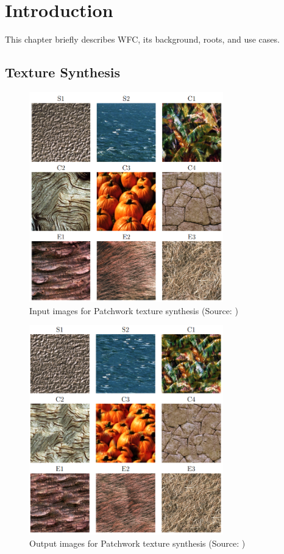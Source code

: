 \documentclass[shortabstract, english, inz]{iithesis}
\author         {Krzysztof Sławik}
\date          {03.02.2023}                     %
\begin{document}

\chapter{Introduction}
This chapter briefly describes WFC, its background, roots, and use cases.
\section{Texture Synthesis}
\begin{figure}[H]
\centering
\includegraphics[width=0.75\textwidth, angle=0]{images/texsynth_input.png}
\caption{Input images for Patchwork texture synthesis (Source: \cite{harrison2002patchwork})}
\label{fig:texSynthIn}
\end{figure}
\begin{figure}[H]
\centering
\includegraphics[width=0.75\textwidth, angle=0]{images/texsynth_output.png}
\caption{Output images for Patchwork texture synthesis (Source: \cite{harrison2002patchwork})}
\label{fig:texSynthOut}
\end{figure}
\end{document}
